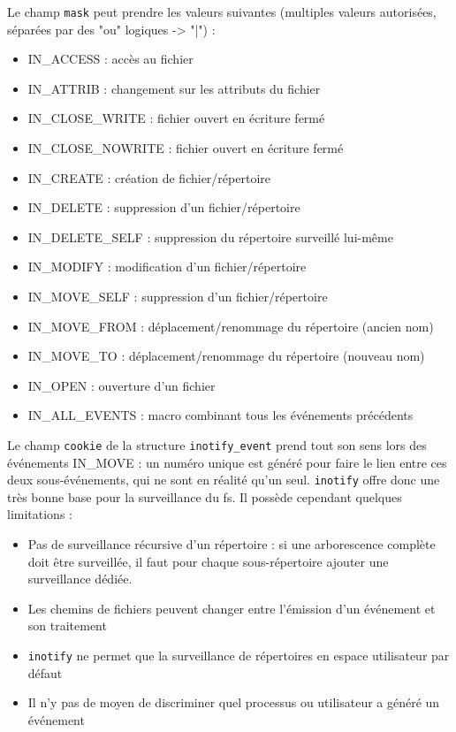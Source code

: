 \documentclass[a4paper, 12pt]{article}
\begin{document}
\bigbreak
Le champ \texttt{mask} peut prendre les valeurs suivantes (multiples valeurs autorisées, 
séparées par des "ou" logiques -> "|") :
\begin{itemize}
    \item IN\_ACCESS : accès au fichier
    \item IN\_ATTRIB : changement sur les attributs du fichier
    \item IN\_CLOSE\_WRITE : fichier ouvert en écriture fermé
    \item IN\_CLOSE\_NOWRITE : fichier ouvert en écriture fermé
    \item IN\_CREATE : création de fichier/répertoire
    \item IN\_DELETE : suppression d'un fichier/répertoire
    \item IN\_DELETE\_SELF : suppression du répertoire surveillé lui-même
    \item IN\_MODIFY : modification d'un fichier/répertoire
    \item IN\_MOVE\_SELF : suppression d'un fichier/répertoire
    \item IN\_MOVE\_FROM : déplacement/renommage du répertoire (ancien nom)
    \item IN\_MOVE\_TO : déplacement/renommage du répertoire (nouveau nom)
    \item IN\_OPEN : ouverture d'un fichier
    \item IN\_ALL\_EVENTS : macro combinant tous les événements précédents
\end{itemize}
Le champ \texttt{cookie} de la structure \texttt{inotify_event} prend tout son sens 
lors des événements IN\_MOVE : un numéro unique est généré pour faire le lien entre ces deux 
sous-événements, qui ne sont en réalité qu'un seul. \texttt{inotify} offre donc une très bonne base pour 
la surveillance du \acrshort{fs}. Il possède cependant quelques limitations :
\begin{itemize}
    \item Pas de surveillance récursive d'un répertoire : si une arborescence complète doit être 
        surveillée, il faut pour chaque sous-répertoire ajouter une surveillance dédiée.
    \item Les chemins de fichiers peuvent changer entre l'émission d'un événement et son traitement
    \item \texttt{inotify} ne permet que la surveillance de répertoires en espace utilisateur par défaut
    \item Il n'y pas de moyen de discriminer quel processus ou utilisateur a généré un événement
\end{itemize}
\end{document}
